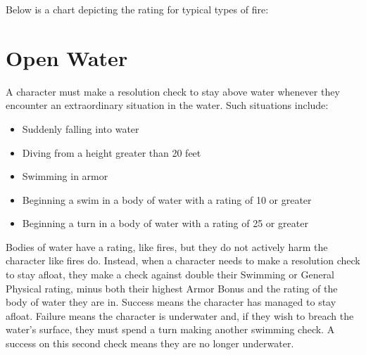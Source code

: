 \documentclass[oneside]{book}
\begin{document}
\begin{multicols}{2}
Below is a chart depicting the rating for typical types of fire: 


\begin{center}
\end{center}

\section{Open Water}

A character must make a resolution check to stay above water whenever they encounter an extraordinary situation in the water. Such situations include: 
\begin{itemize}
		\setlength{\itemsep}{0cm}%
  		\setlength{\parskip}{0cm}%
		\item{Suddenly falling into water}
		\item{Diving from a height greater than 20 feet}
		\item{Swimming in armor}
		\item{Beginning a swim in a body of water with a rating of 10 or greater}
		\item{Beginning a turn in a body of water with a rating of 25 or greater}
	\end{itemize}

Bodies of water have a rating, like fires, but they do not actively harm the character like fires do. Instead, when a character needs to make a resolution check to stay afloat, they make a check against double their Swimming or General Physical rating, minus both their highest Armor Bonus and the rating of the body of water they are in. Success means the character has managed to stay afloat. Failure means the character is underwater and, if they wish to breach the water's surface, they must spend a turn making another swimming check. A success on this second check means they are no longer underwater.


\end{multicols}
\end{document}
